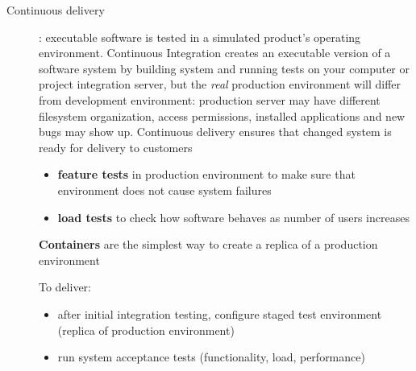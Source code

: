 \begin{description}
   \item[Continuous delivery]: executable software is tested in a simulated product’s operating environment.\nl
         Continuous Integration creates an executable version of a software system by building system and running tests on your computer or project integration server, but the \textit{real} production environment will differ from development
         environment: production server may have different filesystem organization, access permissions, installed applications and new bugs may show up. \nl
         Continuous delivery ensures that changed system is ready for delivery to customers
         \begin{itemize}
            \item \textbf{feature tests} in production environment to make sure that environment does not cause system failures
            \item \textbf{load tests} to check how software behaves as number of users increases
         \end{itemize}
         \textbf{Containers} are the simplest way to create a replica of a production environment

         To deliver:
         \begin{itemize}
            \item after initial integration testing, configure staged test environment (replica of production environment)
            \item run system acceptance tests (functionality, load, performance)
         \end{itemize}



\end{description}
